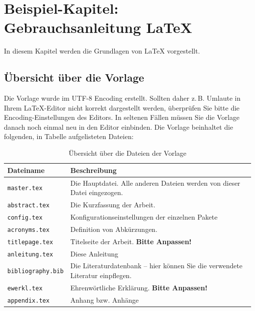 \chapter{Beispiel-Kapitel: Gebrauchsanleitung \LaTeX}

\nocite{*}

In diesem Kapitel werden die Grundlagen von \LaTeX{} vorgestellt.

\section{Übersicht über die Vorlage}
Die Vorlage wurde im UTF-8 Encoding erstellt. Sollten daher z.\,B. Umlaute in Ihrem \LaTeX-Editor nicht korrekt dargestellt werden, überprüfen Sie bitte die Encoding-Ein\-stel\-lun\-gen des Editors. In seltenen Fällen müssen Sie die Vorlage danach noch einmal neu in den Editor einbinden. 
Die Vorlage beinhaltet die folgenden, in Tabelle aufgelisteten Dateien: 
\begin{table}[h!]
	\centering
\begin{tabular}{lp{10cm}}
	\textbf{Dateiname} & \textbf{Beschreibung}\\\toprule
	\texttt{master.tex} & Die Hauptdatei. Alle anderen Dateien werden von dieser Datei eingezogen. \\
	\texttt{abstract.tex} & Die Kurzfassung der Arbeit. \\	
	\texttt{config.tex} & Konfigurationseinstellungen 	 der einzelnen Pakete\\
	\texttt{acronyms.tex} & Definition von Abkürzungen. \\
	\texttt{titlepage.tex} & Titelseite der Arbeit. \textbf{Bitte Anpassen!}\\
	\texttt{anleitung.tex} & Diese Anleitung\\ 
	\texttt{bibliography.bib}&  Die Literaturdatenbank -- hier können Sie die verwendete Literatur einpflegen.\\
	\texttt{ewerkl.tex} & Ehrenwörtliche Erklärung. \textbf{Bitte Anpassen!}\\
	\texttt{appendix.tex} & Anhang bzw. Anhänge \\\bottomrule
\end{tabular}
\caption{\label{tab:dateien}Übersicht über die Dateien der Vorlage}
\end{table}

